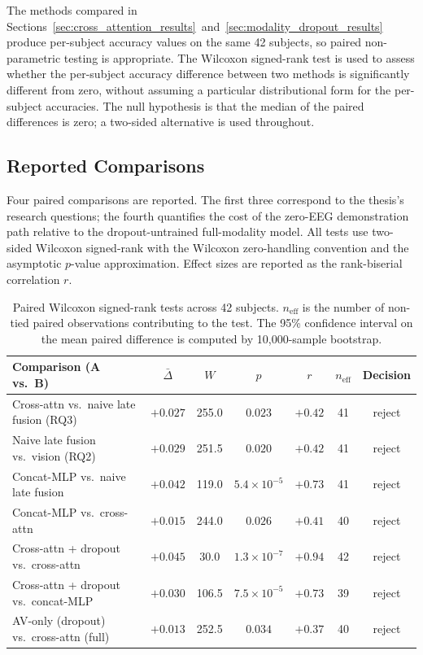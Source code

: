 The methods compared in Sections~\ref{sec:cross_attention_results}~and~\ref{sec:modality_dropout_results} produce per-subject accuracy values on the same 42 subjects, so paired non-parametric testing is appropriate. The Wilcoxon signed-rank test is used to assess whether the per-subject accuracy difference between two methods is significantly different from zero, without assuming a particular distributional form for the per-subject accuracies. The null hypothesis is that the median of the paired differences is zero; a two-sided alternative is used throughout.

\subsection{Reported Comparisons}

Four paired comparisons are reported. The first three correspond to the thesis's research questions; the fourth quantifies the cost of the zero-EEG demonstration path relative to the dropout-untrained full-modality model. All tests use two-sided Wilcoxon signed-rank with the Wilcoxon zero-handling convention and the asymptotic $p$-value approximation. Effect sizes are reported as the rank-biserial correlation $r$.

\begin{table}[htbp]
\centering
\small
\caption{Paired Wilcoxon signed-rank tests across 42 subjects. $n_{\mathrm{eff}}$ is the number of non-tied paired observations contributing to the test. The 95\% confidence interval on the mean paired difference is computed by 10{,}000-sample bootstrap.}
\label{tab:wilcoxon_results}
\begin{tabular}{p{5.5cm} c c c c c c}
\hline
\textbf{Comparison (A vs.\ B)} & \textbf{$\bar{\Delta}$} & \textbf{$W$} & \textbf{$p$} & \textbf{$r$} & \textbf{$n_{\mathrm{eff}}$} & \textbf{Decision} \\
\hline
Cross-attn vs.\ naive late fusion (RQ3) & $+0.027$ & 255.0 & $0.023$  & $+0.42$ & 41 & reject \\
Naive late fusion vs.\ vision (RQ2)     & $+0.029$ & 251.5 & $0.020$  & $+0.42$ & 41 & reject \\
Concat-MLP vs.\ naive late fusion       & $+0.042$ & 119.0 & $5.4 \times 10^{-5}$ & $+0.73$ & 41 & reject \\
Concat-MLP vs.\ cross-attn              & $+0.015$ & 244.0 & $0.026$  & $+0.41$ & 40 & reject \\
Cross-attn + dropout vs.\ cross-attn    & $+0.045$ & 30.0  & $1.3 \times 10^{-7}$ & $+0.94$ & 42 & reject \\
Cross-attn + dropout vs.\ concat-MLP    & $+0.030$ & 106.5 & $7.5 \times 10^{-5}$ & $+0.73$ & 39 & reject \\
AV-only (dropout) vs.\ cross-attn (full) & $+0.013$ & 252.5 & $0.034$  & $+0.37$ & 40 & reject \\
\hline
\end{tabular}
\end{table}

